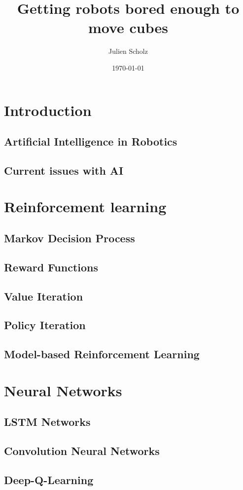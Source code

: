 \documentclass{article}
\title{Getting robots bored enough to move cubes}
\author{Julien Scholz}
\date{\today}
\begin{document}



\tableofcontents

\section{Introduction}
\subsection{Artificial Intelligence in Robotics}
\subsection{Current issues with AI}

\section{Reinforcement learning}
\subsection{Markov Decision Process}
\subsection{Reward Functions}
\subsection{Value Iteration}
\subsection{Policy Iteration}
\subsection{Model-based Reinforcement Learning}

\section{Neural Networks}
\subsection{LSTM Networks}
\subsection{Convolution Neural Networks}
\subsection{Deep-Q-Learning}
\end{document}
